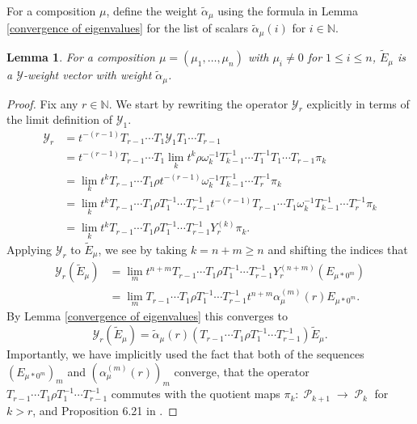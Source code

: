 \documentclass[11pt]{article}
\newtheorem{lemm}[theo]{Lemma}
\theoremstyle{definition}
\numberwithin{equation}{section}
\newcommand{\y}{{ \mathscr{Y} }}
\DeclareMathOperator{\sP}{\mathscr{P} }
\begin{document}
For a composition $\mu$, define the weight $\widetilde{\alpha}_{\mu}$ using the formula in Lemma \ref{convergence of eigenvalues} for the list of scalars  $\widetilde{\alpha}_{\mu}(i)$ for $i \in \mathbb{N}$.

\begin{lemm} \label{weight vector if nonzero parts}
For a composition $\mu = (\mu_1,\ldots,\mu_n)$ with $\mu_i \neq 0$ for $1\leq i \leq n$, $\widetilde{E}_{\mu}$ is a $\y$-weight vector with weight $\widetilde{\alpha}_{\mu}$. 
\end{lemm}

\begin{proof}
Fix any $r \in \mathbb{N}$. We start by rewriting the operator $\y_r$ explicitly in terms of the limit definition of $\y_1$.
\begin{align*}
\y_r &= t^{-(r-1)}T_{r-1}\cdots T_1 \y_1 T_1 \cdots T_{r-1}\\
&= t^{-(r-1)}T_{r-1}\cdots T_1 \lim_{k} t^{k} \rho \omega_k ^{-1} T_{k-1}^{-1}\cdots T_{1}^{-1}T_1\cdots T_{r-1} \pi_k \\
&= \lim_{k} t^{k} T_{r-1}\cdots T_1 \rho t^{-(r-1)} \omega_k ^{-1} T_{k-1}^{-1}\cdots T_{r}^{-1}\pi_k \\
&= \lim_{k} t^{k} T_{r-1}\cdots T_1 \rho T_1^{-1} \cdots T_{r-1}^{-1} t^{-(r-1)} T_{r-1} \cdots T_{1}  \omega_k ^{-1} T_{k-1}^{-1}\cdots T_{r}^{-1} \pi_k \\
&= \lim_{k} t^{k} T_{r-1}\cdots T_1 \rho T_1^{-1} \cdots T_{r-1}^{-1} Y_{r}^{(k)}\pi_k.
\end{align*}
Applying $\y_r$ to $\widetilde{E}_{\mu}$, we see by taking $k = n+m \geq n$ and shifting the indices that
\begin{align*}
\y_r(\widetilde{E}_{\mu}) &= \lim_{m} t^{n+m} T_{r-1}\cdots T_1 \rho T_1^{-1} \cdots T_{r-1}^{-1} Y_{r}^{(n+m)}(E_{\mu*0^{m}}) \\
&= \lim_{m} T_{r-1}\cdots T_1 \rho T_1^{-1} \cdots T_{r-1}^{-1}  t^{n+m} \alpha_{\mu}^{(m)}(r) E_{\mu*0^{m}}.
\end{align*}
By Lemma \ref{convergence of eigenvalues} this converges to 
$$ \y_r( \widetilde{E}_{\mu}) = \widetilde{\alpha}_{\mu}(r) (T_{r-1}\cdots T_1 \rho T_1^{-1}\cdots T_{r-1}^{-1}) \widetilde{E}_{\mu} .$$ 
Importantly, we have implicitly used the fact that both of the sequences $(E_{\mu*0^{m}})_{m}$ and $(\alpha_{\mu}^{(m)}(r))_{m}$ converge, that the operator $T_{r-1}\cdots T_1 \rho T_1^{-1}\cdots T_{r-1}^{-1}$ commutes with the quotient maps $\pi_k: \sP_{k+1} \rightarrow \sP_{k}$ for $k> r$, and Proposition 6.21 in \cite{Ion_2022}.

\end{proof}
\end{document}
